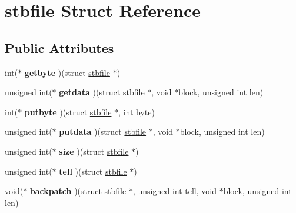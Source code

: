\hypertarget{structstbfile}{\section{stbfile Struct Reference}
\label{structstbfile}
}
\subsection*{Public Attributes}
\begin{DoxyCompactItemize}
\item 
\hypertarget{structstbfile_a277bf1fdae52523a617b4257074a84ca}{int($\ast$ {\bfseries getbyte} )(struct \hyperlink{structstbfile}{stbfile} $\ast$)}\label{structstbfile_a277bf1fdae52523a617b4257074a84ca}

\item 
\hypertarget{structstbfile_a48bfb2a1e9bd330124aed2869d1a547f}{unsigned int($\ast$ {\bfseries getdata} )(struct \hyperlink{structstbfile}{stbfile} $\ast$, void $\ast$block, unsigned int len)}\label{structstbfile_a48bfb2a1e9bd330124aed2869d1a547f}

\item 
\hypertarget{structstbfile_a8cd52e0c8b34d3dc0cc0a758b036261d}{int($\ast$ {\bfseries putbyte} )(struct \hyperlink{structstbfile}{stbfile} $\ast$, int byte)}\label{structstbfile_a8cd52e0c8b34d3dc0cc0a758b036261d}

\item 
\hypertarget{structstbfile_a1e384abbe103f402b4a066e193c38a7c}{unsigned int($\ast$ {\bfseries putdata} )(struct \hyperlink{structstbfile}{stbfile} $\ast$, void $\ast$block, unsigned int len)}\label{structstbfile_a1e384abbe103f402b4a066e193c38a7c}

\item 
\hypertarget{structstbfile_a1382b7436c94a5064ca1bff0e5bb6edd}{unsigned int($\ast$ {\bfseries size} )(struct \hyperlink{structstbfile}{stbfile} $\ast$)}\label{structstbfile_a1382b7436c94a5064ca1bff0e5bb6edd}

\item 
\hypertarget{structstbfile_a8da1c1127b8c12abbec3d6784f9970de}{unsigned int($\ast$ {\bfseries tell} )(struct \hyperlink{structstbfile}{stbfile} $\ast$)}\label{structstbfile_a8da1c1127b8c12abbec3d6784f9970de}

\item 
\hypertarget{structstbfile_a62eb88505a258ec26d0af539c0738cd4}{void($\ast$ {\bfseries backpatch} )(struct \hyperlink{structstbfile}{stbfile} $\ast$, unsigned int tell, void $\ast$block, unsigned int len)}\label{structstbfile_a62eb88505a258ec26d0af539c0738cd4}


\end{DoxyCompactItemize}
